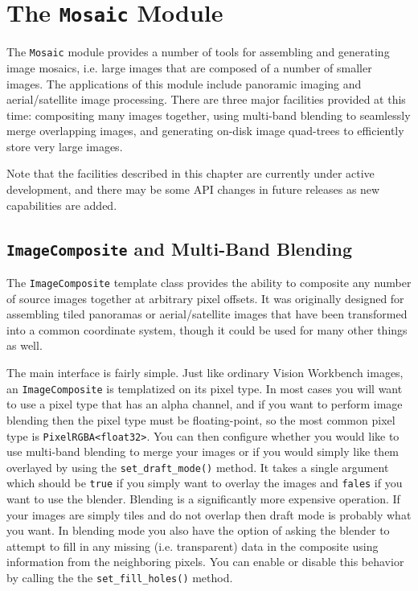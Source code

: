 \chapter{The {\tt Mosaic} Module}\label{ch:mosaic-module}

The \verb#Mosaic# module provides a number of tools for assembling and
generating image mosaics, i.e. large images that are composed of a
number of smaller images.  The applications of this module include
panoramic imaging and aerial/satellite image processing.  There are 
three major facilities provided at this time: compositing many images 
together, using multi-band blending to seamlessly merge overlapping 
images, and generating on-disk image quad-trees to efficiently store 
very large images.

Note that the facilities described in this chapter are currently under
active development, and there may be some API changes in future
releases as new capabilities are added.

\section{{\tt ImageComposite} and Multi-Band Blending}\label{sec:imagecomposite}

The \verb#ImageComposite# template class provides the ability to
composite any number of source images together at arbitrary pixel
offsets.  It was originally designed for assembling tiled panoramas or
aerial/satellite images that have been transformed into a common
coordinate system, though it could be used for many other things as
well.

The main interface is fairly simple.  Just like ordinary Vision
Workbench images, an \verb#ImageComposite# is templatized on its pixel
type.  In most cases you will want to use a pixel type that has an
alpha channel, and if you want to perform image blending then the
pixel type must be floating-point, so the most common pixel type is
\verb#PixelRGBA<float32>#.  You can then configure whether you would
like to use multi-band blending to merge your images or if you would
simply like them overlayed by using the \verb#set_draft_mode()#
method.  It takes a single argument which should be \verb#true# if you
simply want to overlay the images and \verb#fales# if you want to use
the blender.  Blending is a significantly more expensive operation.
If your images are simply tiles and do not overlap then draft mode is
probably what you want.  In blending mode you also have the option of
asking the blender to attempt to fill in any missing
(i.e. transparent) data in the composite using information from the
neighboring pixels.  You can enable or disable this behavior by
calling the the \verb#set_fill_holes()# method.

